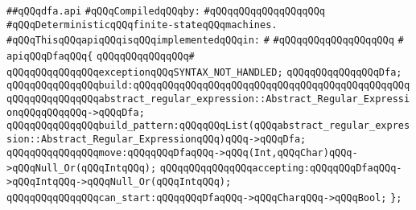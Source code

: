 \label{src/lib/regex/backend/dfa.api}
\verb|##qQQqdfa.api|\newline
\newline
\verb|#qQQqCompiledqQQqby:|\newline
\verb|#qQQqqQQqqQQqqQQqqQQq|\newline
\newline
\verb|#qQQqDeterministicqQQqfinite-stateqQQqmachines.|\newline
\newline
\newline
\verb|#qQQqThisqQQqapiqQQqisqQQqimplementedqQQqin:|\newline
\verb|#|\newline
\verb|#qQQqqQQqqQQqqQQqqQQq|\newline
\verb|#|\newline
\verb|apiqQQqDfaqQQq{|\newline
\verb|qQQqqQQqqQQqqQQq#|\newline
\verb|qQQqqQQqqQQqqQQqexceptionqQQqSYNTAX_NOT_HANDLED;|\newline
\newline
\verb|qQQqqQQqqQQqqQQqDfa;|\newline
\newline
\verb|qQQqqQQqqQQqqQQqbuild:qQQqqQQqqQQqqQQqqQQqqQQqqQQqqQQqqQQqqQQqqQQqqQQqqQQqqQQqqQQqqQQqabstract_regular_expression::Abstract_Regular_ExpressionqQQqqQQqqQQq->qQQqDfa;|\newline
\verb|qQQqqQQqqQQqqQQqbuild_pattern:qQQqqQQqList(qQQqabstract_regular_expression::Abstract_Regular_ExpressionqQQq)qQQq->qQQqDfa;|\newline
\verb|qQQqqQQqqQQqqQQqmove:qQQqqQQqDfaqQQq->qQQq(Int,qQQqChar)qQQq->qQQqNull_Or(qQQqIntqQQq);|\newline
\verb|qQQqqQQqqQQqqQQqaccepting:qQQqqQQqDfaqQQq->qQQqIntqQQq->qQQqNull_Or(qQQqIntqQQq);|\newline
\verb|qQQqqQQqqQQqqQQqcan_start:qQQqqQQqDfaqQQq->qQQqCharqQQq->qQQqBool;|\newline
\newline
\verb|};|\newline
\newline

